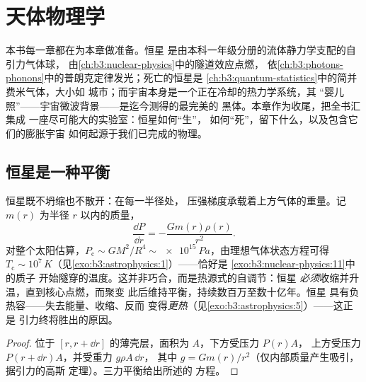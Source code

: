 \chapter{天体物理学}\label{ch:b3:astrophysics}


本书每一章都在为本章做准备。恒星
是由本科一年级分册的流体静力学支配的自引力气体球，
由\cref{ch:b3:nuclear-physics}中的隧道效应点燃，
依\cref{ch:b3:photons-phonons}中的普朗克定律发光；死亡的恒星是
\cref{ch:b3:quantum-statistics}中的简并费米气体，大小如
城市；而宇宙本身是一个正在冷却的热力学系统，其
“婴儿照”——宇宙微波背景——是迄今测得的最完美的
黑体。本章作为收尾，把全书汇集成
一座尽可能大的实验室：恒星如何“生”，
如何“死”，留下什么，以及包含它们的膨胀宇宙
如何起源于我们已完成的物理。

\section{恒星是一种平衡}

\begin{proposition}[流体静力平衡]\label{prop:b3:astrophysics:hydrostatic}
恒星既不坍缩也不散开：在每一半径处，
压强梯度承载着上方气体的重量。记
$m(r)$ 为半径 $r$ 以内的质量，
\[
\frac{\dd P}{\dd r} = -\frac{Gm(r)\rho(r)}{r^2} .
\]
对整个太阳估算，$P_{\text{c}} \sim GM^2/R^4 \sim
\qty{e15}{Pa}$，由理想气体状态方程可得 $T_{\text{c}} \sim
10^7\,\unit{K}$（见\cref{exo:b3:astrophysics:1}）——恰好是
\cref{exo:b3:nuclear-physics:11}中的质子
开始隧穿的温度。这并非巧合，而是热源式的自调节：恒星
\emph{必须}收缩并升温，直到核心点燃，而聚变
此后维持平衡，持续数百万至数十亿年。恒星
具有负热容——失去能量、收缩、反而
变得\emph{更热}（见\cref{exo:b3:astrophysics:5}）——这正是
引力终将胜出的原因。
\end{proposition}

\begin{proof}
位于 $[r, r + \dd r]$ 的薄壳层，面积为 $A$，下方受压力 $P(r)A$，
上方受压力 $P(r + \dd r)A$，并受重力 $g\rho A\,\dd r$，
其中 $g = Gm(r)/r^2$（仅内部质量产生吸引，据引力的高斯
定理）。三力平衡给出所述的
方程。
\end{proof}

